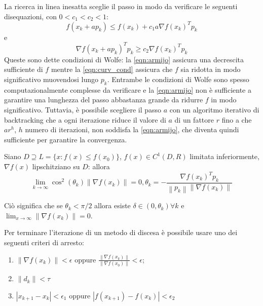 \documentclass[answers, a4paper]{exam}
\newcommand{\norm}[1]{\left\lVert#1\right\rVert}
\begin{document}
\begin{questions}
\begin{solution}
	La ricerca in linea inesatta sceglie il passo in modo da verificare le seguenti disequazioni, con $0 < c_1 < c_2 < 1$:
	\begin{equation}
		\label{eqn:armijo}
		f(x_k + a p_k) \leq f(x_k) + c_1 a \nabla f(x_k)^T p_k
	\end{equation}
	e 
	\begin{equation}
		\label{eqn:curv_cond}
		\nabla f(x_k + a p_k) ^T p_k \geq c_2 \nabla f(x_k)^T p_k
	\end{equation}
	Queste sono dette condizioni di Wolfe: la \cref{eqn:armijo} assicura una decrescita sufficiente di $f$ mentre la \cref{eqn:curv_cond} assicura che $f$ sia ridotta in modo significativo muovendosi lungo $p_k$.
	Entrambe le condizioni di Wolfe sono spesso computazionalmente complesse da verificare e la \cref{eqn:armijo} non è sufficiente a garantire una lunghezza del passo abbastanza grande da ridurre $f$ in modo significativo. 
	Tuttavia, è possibile scegliere il passo $a$ con un algoritmo iterativo di backtracking che a ogni iterazione riduce il valore di $a$ di un fattore $r$ fino a che $ar^h$, $h$ numero di iterazioni, non soddisfa la \cref{eqn:armijo}, che diventa quindi sufficiente per garantire la convergenza.

	Siano $D \supseteq L = \{x : f(x) \leq f(x_0)\}$, $f(x) \in C^1(D, R)$ limitata inferiormente, $\nabla f(x)$ lipschitziano su $D$: allora 
	\begin{equation}
		\lim_{k \rightarrow \infty} \cos^2 (\theta_k) \norm{\nabla f(x_k)} = 0, \theta_k = -\frac{\nabla f(x_k)^T p_k}{\norm{p_k}\norm{\nabla f(x_k)}}
	\end{equation}

	Ciò significa che se $\theta_k < \pi/2$ allora esiste $\delta \in (0, \theta_k) \forall k$ e $\lim_{x \rightarrow \infty} \norm{\nabla f(x_k)} = 0$.

	Per terminare l'iterazione di un metodo di discesa è possibile usare uno dei seguenti criteri di arresto:
	\begin{enumerate}
		\item $\norm{\nabla f(x_k)} < \epsilon$ oppure $\frac{\norm{\nabla f(x_k)}}{\norm{\nabla f(x_0)}} < \epsilon$;
		\item $\norm{d_k} < \tau$
		\item $|x_{k + 1} - x_k| < \epsilon_1$ oppure $|f(x_{k + 1}) - f(x_k)| < \epsilon_2$
	\end{enumerate}



\end{solution}
\end{questions}
\end{document}
